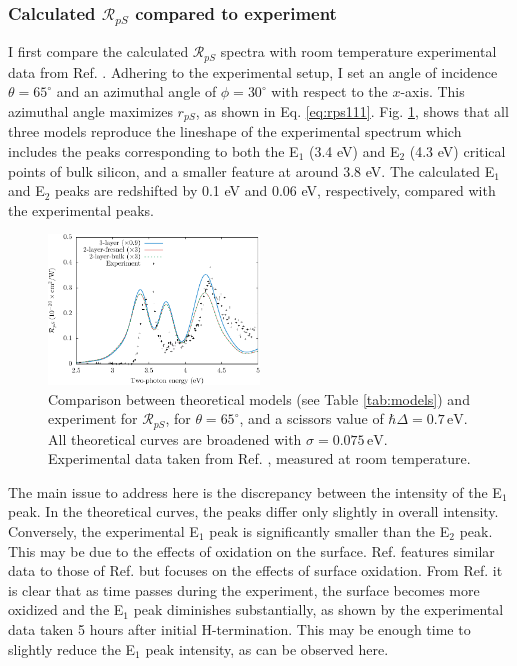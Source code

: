 
\subsubsection{Calculated \texorpdfstring{$\mathcal{R}_{pS}$}{RpS} compared to 
experiment}\label{sec:1x1RpS}

I first compare the calculated $\mathcal{R}_{pS}$ spectra with room temperature
experimental data from Ref. \cite{mejiaPRB02}. Adhering to the experimental
setup, I set an angle of incidence $\theta=65^{\circ}$ and an azimuthal angle of
$\phi=30^\circ$ with respect to the $x$-axis. This azimuthal angle maximizes
$r_{pS}$, as shown in Eq. \eqref{eq:rps111}. Fig. \ref{fig:RpS}, shows that all
three models reproduce the lineshape of the experimental spectrum which includes
the peaks corresponding to both the E$_{1}$ (3.4 eV) and E$_{2}$ (4.3 eV)
critical points of bulk silicon, and a smaller feature at around 3.8 eV. The
calculated E$_{1}$ and E$_{2}$ peaks are redshifted by 0.1 eV and 0.06 eV,
respectively, compared with the experimental peaks.

\begin{figure}[H]
\centering
\includegraphics[width=0.5\textwidth]{content/figures/fig-Si1x1-Mejia_RpS}
\caption{Comparison between theoretical models (see Table \ref{tab:models}) and
experiment for $\mathcal{R}_{pS}$, for $\theta=65^{\circ}$, and a scissors
value of $\hbar\Delta = 0.7\,\text{eV}$. All theoretical curves are broadened
with $\sigma=0.075\,\text{eV}$. Experimental data taken from Ref.
\cite{mejiaPRB02}, measured at room temperature.}
\label{fig:RpS}
\end{figure}

The main issue to address here is the discrepancy between the intensity of the
E$_{1}$ peak. In the theoretical curves, the peaks differ only slightly in
overall intensity. Conversely, the experimental E$_{1}$ peak is significantly
smaller than the E$_{2}$ peak. This may be due to the effects of oxidation on
the surface. Ref. \cite{bergfeldPRL04} features similar data to those of Ref.
\cite{mejiaPRB02} but focuses on the effects of surface oxidation. From Ref.
\cite{bergfeldPRL04} it is clear that as time passes during the experiment, the
surface becomes more oxidized and the E$_{1}$ peak diminishes substantially, as
shown by the experimental data taken 5 hours after initial H-termination. This
may be enough time to slightly reduce the E$_{1}$ peak intensity, as can be
observed here.

